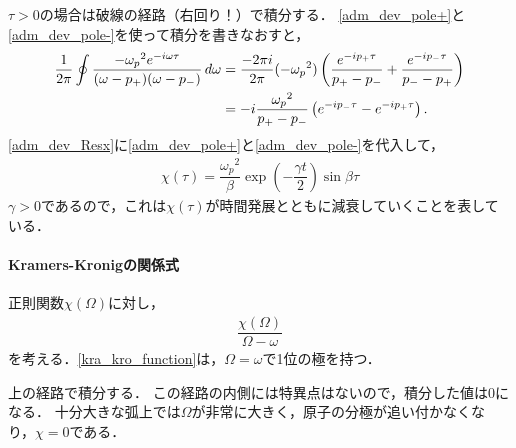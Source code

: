 $\tau > 0$の場合は破線の経路（右回り！）で積分する．
\eqref{adm_dev_pole+}と\eqref{adm_dev_pole-}を使って積分を書きなおすと，
\begin{align}
  \dfrac{1}{2\pi} \oint \dfrac{-{\omega_p}^2e^{-i\omega\tau}}{(\omega-p_+)(\omega-p_-)} \, d\omega
  &= \frac{-2\pi i}{2\pi} (-\omega_p{}^2) \left( \frac{e^{-ip_+\tau}}{p_+ - p_-} + \frac{e^{-ip_-\tau}}{p_- - p_+} \right)\notag \\
  &= -i\dfrac{{\omega_p}^2}{p_+ - p_-}\left(e^{-ip_-\tau} - e^{-ip_+\tau}\right). \label{adm_dev_Resx}
\end{align}
\eqref{adm_dev_Resx}に\eqref{adm_dev_pole+}と\eqref{adm_dev_pole-}を代入して，
\begin{align}
  \chi(\tau)=\dfrac{{\omega_p}^2}{\beta}\exp\left(-\dfrac{\gamma{t}}{2}\right)\sin\beta\tau \label{adm_dev_xtcon}
\end{align}
$\gamma > 0$であるので，これは$\chi(\tau)$が時間発展とともに減衰していくことを表している．

\paragraph{Kramers-Kronigの関係式}
正則関数$\chi(\Omega)$に対し，
\begin{align}
  \dfrac{\chi(\Omega)}{\Omega - \omega} \label{kra_kro_function}
\end{align}
を考える．\eqref{kra_kro_function}は，$\Omega=\omega$で1位の極を持つ．

\begin{center}
\end{center}

上の経路で積分する．
この経路の内側には特異点はないので，積分した値は$0$になる．
十分大きな弧上では$\Omega$が非常に大きく，原子の分極が追い付かなくなり，$\chi=0$である．

